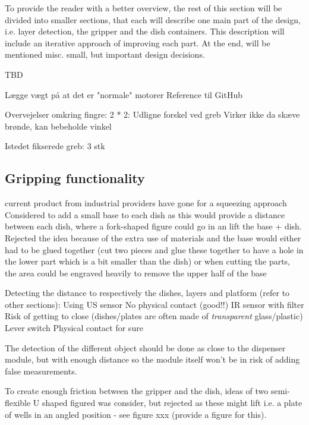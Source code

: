 \documentclass{sigchi}
\begin{document}
	To provide the reader with a better overview, the rest of this section will be divided into smaller sections, that each will describe one main part of the design, i.e. layer detection, the gripper and the dish containers. This description will include an iterative approach of improving each part. At the end, will be mentioned misc. small, but important design decisions.
	
	
	
	TBD
	
	Lægge vægt på at det er "normale" motorer
	Reference til GitHub
	
	
	Overvejelser  omkring fingre: 
		2 * 2: Udligne forskel ved greb
			Virker ikke da skæve brønde, kan bebeholde vinkel
		
		Istedet fikserede greb: 3 stk
			
			
	
	
	\subsection{Gripping functionality}
	current product from industrial providers have gone for a squeezing approach
	Considered to add a small base to each dish as this would provide a distance between each dish, where a fork-shaped figure could go in an lift the base + dish. 
		Rejected the idea because of the extra use of materials and the base would either had to be glued together (cut two pieces and glue these together to have a hole in the lower part which is a bit smaller than the dish) or when cutting the parts, the area could be engraved heavily to remove the upper half of the base
	
	Detecting the distance to respectively the dishes, layers and platform (refer to other sections): 
		Using US sensor
			No physical contact (good!!)
		IR sensor with filter 
			Risk of getting to close (dishes/plates are often made of \textit{transparent} glass/plastic)
		Lever switch
			Physical contact for sure
			
		The detection of the different object should be done as close to the dispenser module, but with enough distance so the  module itself won't be in risk of adding false measurements.		
	
	
	
		To create enough friction between the gripper and the dish, ideas of two semi-flexible U shaped figured was consider, but rejected as these might lift i.e. a plate of wells in an angled position - see figure xxx (provide a figure for this).
		
\end{document}
